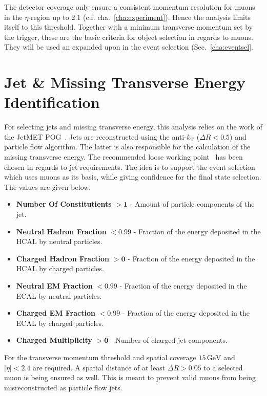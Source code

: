 The detector coverage only ensure a consistent momentum resolution for muons in the $\eta$-region up to 2.1 (c.f. cha.~\ref{cha:experiment}). Hence the analysis limits itself to this threshold. Together with a minimum transverse momentum set by the trigger, these are the basic criteria for object selection in regards to muons. They will be used an expanded upon in the event selection (Sec.~\ref{cha:eventsel}. 


\section{Jet \& Missing Transverse Energy Identification}
\label{sec:jetid}

For selecting jets and missing transverse energy, this analysis relies on the work of the JetMET POG~\cite{jmepog}. Jets are reconstructed using the anti-$k_{\text{T}}$ ($\Delta R < 0.5$) and particle flow algorithm. The latter is also responsible for the calculation of the missing transverse energy. The recommended loose working point~\cite{jetid, jetidpf} has been chosen in regards to jet requirements. The idea is to support the event selection which uses muons as its basis, while giving confidence for the final state selection. The values are given below.

\begin{itemize}
\item \textbf{Number Of Constitutients} $\mathbf{> 1}$ - Amount of particle components of the jet.
\item \textbf{Neutral Hadron Fraction} $\mathbf{< 0.99}$ - Fraction of the energy deposited in the HCAL by neutral particles.
\item \textbf{Charged Hadron Fraction} $\mathbf{> 0}$ - Fraction of the energy deposited in the HCAL by charged particles.
\item \textbf{Neutral EM Fraction} $\mathbf{< 0.99}$ - Fraction of the energy deposited in the ECAL by neutral particles.
\item \textbf{Charged EM Fraction} $\mathbf{< 0.99}$ - Fraction of the energy deposited in the ECAL by charged particles.
\item \textbf{Charged Multiplicity} $\mathbf{> 0}$ - Number of charged jet components.
\end{itemize}

For the transverse momentum threshold and spatial coverage $15\,\text{GeV}$ and $|\eta|  < 2.4$ are required. A spatial distance of at least $\Delta R > 0.05$ to a selected muon is being ensured as well. This is meant to prevent valid muons from being misreconstructed as particle flow jets. 

